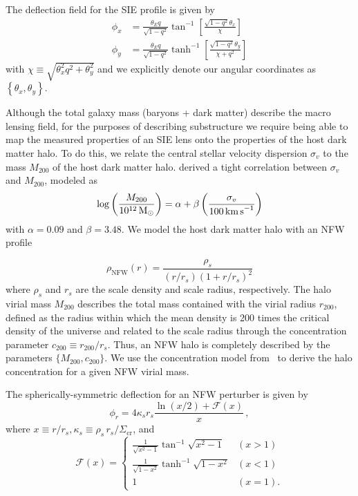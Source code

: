 \documentclass[twocolumn]{aastex63}
\begin{document}
The deflection field for the SIE profile is given by~\citep{2001astro.ph..2341K}
\begin{align}
\phi_{x} &=\frac{\theta_E q}{\sqrt{1-q^{2}}} \tan ^{-1}\left[\frac{\sqrt{1-q^{2}} \theta_x}{\chi}\right] \\
\phi_{y} &=\frac{\theta_E q}{\sqrt{1-q^{2}}} \tanh ^{-1}\left[\frac{\sqrt{1-q^{2}} \theta_y}{\chi+q^{2} }\right]
\end{align}
with $\chi \equiv \sqrt{\theta_x^2 q^2 + \theta_y^2}$ and we explicitly denote our angular coordinates as $\left\{\theta_x, \theta_y\right\}$.

Although the total galaxy mass (baryons + dark matter) describe the macro lensing field, for the purposes of describing substructure we require being able to map the measured properties of an SIE lens onto the properties of the host dark matter halo. To do this, we relate the central stellar velocity dispersion $\sigma_v$ to the mass $M_{200}$ of the host dark matter halo. \citet{2018ApJ...859...96Z} derived a tight correlation between $\sigma_v$ and $M_{200}$, modeled as
\begin{equation}
\log\left(\frac{M_{200}}{10^{12}\,\Msun}\right) = \alpha + \beta\left(\frac{\sigma_v}{100\,\kmps}\right)
\label{eq:sigma_v_M_200_relation}
\end{equation}
with $\alpha = 0.09$ and $\beta = 3.48$.
We model the host dark matter halo with an NFW profile~\citep{1996ApJ...462..563N,1997ApJ...490..493N}

\begin{equation}
\rho_\mathrm{NFW}(r)=\frac{\rho_{s}}{\left(r / r_{s}\right)\left(1+r / r_{s}\right)^{2}}
\label{eq:rhoNFW}
\end{equation}
where $\rho_s$ and $r_s$ are the scale density and scale radius, respectively. The halo virial mass $M_{200}$ describes the total mass contained with the virial radius $r_{200}$, defined as the radius within which the mean density is 200 times the critical density of the universe and related to the scale radius through the concentration parameter $c_{200} \equiv r_{200}/r_s$. Thus, an NFW halo is completely described by the parameters $\{M_{200}, c_{200}\}$. We use the concentration model from~\citet{2014MNRAS.442.2271S} to derive the halo concentration for a given NFW virial mass.

The spherically-symmetric deflection for an NFW perturber is given by~\citep{2001astro.ph..2341K}
\begin{equation}
\phi_{r}=4 \kappa_{s} r_{s} \frac{\ln (x / 2)+\mathcal{F}(x)}{x} \,,
\label{eq:nfw_deflection}
\end{equation}
where $x \equiv r/r_s, \kappa_s\equiv \rho_s\,r_s/\Sigma_\mathrm{cr}$, and
\begin{equation}
\mathcal{F}(x)=\left\{\begin{array}{ll}{\frac{1}{\sqrt{x^{2}-1}} \tan ^{-1} \sqrt{x^{2}-1}} & {(x>1)} \\ {\frac{1}{\sqrt{1-x^{2}}} \tanh ^{-1} \sqrt{1-x^{2}}} & {(x<1)} \\ {1} & {(x=1).}\end{array}\right.
\label{eq:Fx}
\end{equation}
\end{document}
